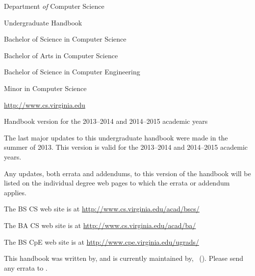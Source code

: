\documentclass[10pt,letter,twocolumn]{book}
\begin{document}
\pagestyle{empty}

\begin{figure*}[h!]

\vspace*{0.5in}

\begin{center}

\vspace{0.75in}

{\huge Department {\em of} Computer Science}

\vspace{12pt}

{\huge Undergraduate Handbook}

\vspace{1in}

{\Large Bachelor of Science in Computer Science}

{\Large Bachelor of Arts in Computer Science}

{\Large Bachelor of Science in Computer Engineering}

{\Large Minor in Computer Science}

\vspace{1in}

{\large \url{http://www.cs.virginia.edu}}

\vspace{0.1in}

{\large Handbook version for the 2013--2014 and 2014--2015 academic years}
\end{center}
\end{figure*}

\clearpage


\begin{figure*}[h!]
\begin{center}
\parbox{3in} {The last major updates to this undergraduate handbook
  were made in the summer of 2013.  This version is valid for the
  2013--2014 and 2014--2015 academic years.
\newline

Any updates, both errata and addendums, to this version of the
handbook will be listed on the individual degree web pages to which
the errata or addendum applies.
\newline

The BS CS web site is at
\url{http://www.cs.virginia.edu/acad/bscs/}
\newline

The BA CS web site is at
\url{http://www.cs.virginia.edu/acad/ba/}
\newline

The BS CpE web site is at
\url{http://www.cpe.virginia.edu/ugrads/}
\newline

This handbook was written by, and is currently maintained by,
\handbookmaintainer\ (\handbookmaintaineremail).  Please send any
errata to \handbookmaintainerpronoun.

}
\end{center}
\end{figure*}
\end{document}
